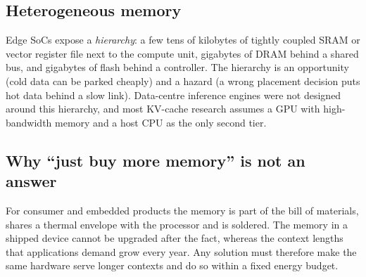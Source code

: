 \documentclass[12pt,a4paper]{report}
\begin{document}
\subsection{Heterogeneous memory}\label{sec:1_4_4}
Edge SoCs expose a \textit{hierarchy}: a few tens of kilobytes of tightly coupled SRAM or vector register file next to the compute unit, gigabytes of DRAM behind a shared bus, and gigabytes of flash behind a controller. The hierarchy is an opportunity (cold data can be parked cheaply) and a hazard (a wrong placement decision puts hot data behind a slow link). Data-centre inference engines were not designed around this hierarchy, and most KV-cache research assumes a GPU with high-bandwidth memory and a host CPU as the only second tier.

\subsection{Why “just buy more memory” is not an answer}\label{sec:1_4_5}
For consumer and embedded products the memory is part of the bill of materials, shares a thermal envelope with the processor and is soldered. The memory in a shipped device cannot be upgraded after the fact, whereas the context lengths that applications demand grow every year. Any solution must therefore make the same hardware serve longer contexts and do so within a fixed energy budget.
\end{document}
